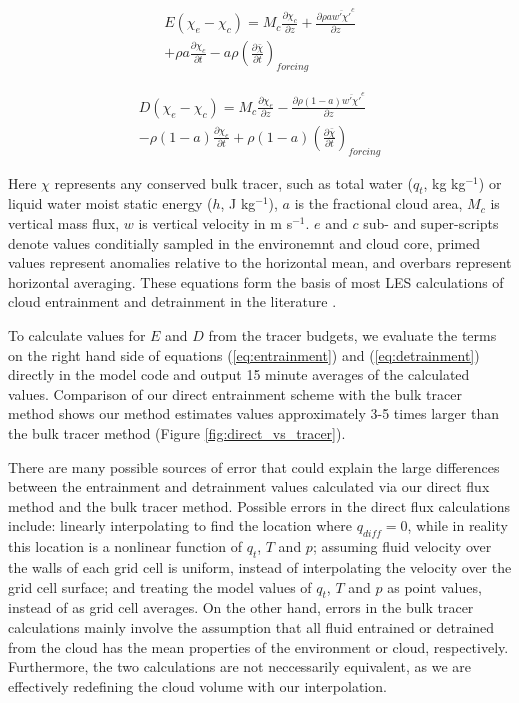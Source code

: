 \documentclass[12pt]{article}
\begin{document}
\begin{equation}
  \label{eq:entrainment}
  \begin{split}
    E (\chi_e - \chi_c) 
    = M_c \frac{\partial \chi_c}{\partial z}
    + \frac{\partial \rho a \overline{w' \chi'}^c}{\partial z} \\
    + \rho a \frac{\partial \chi_c}{\partial t}
    - a \rho \left(\frac{\partial \bar{\chi}}{\partial t}\right)_{forcing}
  \end{split}
\end{equation}

\begin{equation}
  \label{eq:detrainment}
  \begin{split}
    D (\chi_e - \chi_c)
    = M_c \frac{\partial \chi_e}{\partial z}
    - \frac{\partial \rho (1 - a) \overline{w' \chi'}^e}{\partial z} \\
    - \rho (1 - a) \frac{\partial \chi_e}{\partial t}
    + \rho (1 - a) \left(\frac{\partial \bar{\chi}}{\partial t}\right)_{forcing}
  \end{split}
\end{equation}

Here $\chi$ represents any conserved bulk tracer, such as total water ($q_t$, 
kg kg$^{-1}$) or liquid water moist static energy ($h$, J kg$^{-1}$), $a$ is 
the fractional cloud area, $M_c$ is vertical mass flux, $w$ is vertical 
velocity in m s$^{-1}$.  $e$ and $c$ sub- and super-scripts denote values 
conditially sampled in the environemnt and cloud core, primed values represent 
anomalies relative to the horizontal mean, and overbars represent horizontal 
averaging.  These equations form the basis of most LES calculations of 
cloud entrainment and detrainment in the literature 
\citep{Siebesma2003, Rooy2008}.

To calculate values for $E$ and $D$ from the tracer budgets, we evaluate the 
terms on the right hand side of equations (\ref{eq:entrainment}) and 
(\ref{eq:detrainment}) directly in the model code and output 15 minute averages 
of the calculated values.  Comparison of our direct entrainment scheme with 
the bulk tracer method shows our method estimates values approximately 3-5 
times larger than the bulk tracer method (Figure \ref{fig:direct_vs_tracer}).

There are many possible sources of error that could explain the large 
differences between the entrainment and detrainment values calculated 
via our direct flux method and the bulk tracer method.  Possible errors in the 
direct flux calculations include: linearly interpolating to find the location 
where $q_{diff} = 0$, while in reality this location is a nonlinear function 
of $q_t$, $T$ and $p$; assuming fluid velocity over the walls of each grid cell 
is uniform, instead of interpolating the velocity over the grid cell surface; 
and treating the model values of $q_t$, $T$ and $p$ as point values, instead of 
as grid cell averages.  On the other hand, errors in the bulk tracer
calculations mainly involve the assumption that all fluid entrained or
detrained from the cloud has the mean properties of the environment or cloud, 
respectively.  Furthermore, the two calculations are not neccessarily 
equivalent, as we are effectively redefining the cloud volume with our
interpolation.
\end{document}
